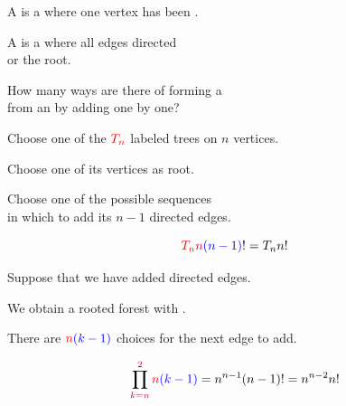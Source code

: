 \begin{frame}{}
  \begin{definition}
    A  is a 
    where one vertex has been .
  \end{definition}

  \pause

  \pause
  \begin{definition}
    A  is a 
    where all edges directed \\  or  the root.
  \end{definition}
\end{frame}

\begin{frame}{}
  \begin{center}
    {How many ways are there of forming a  \\[3pt]
    from an  by adding  one by one?}

    \pause
    \vspace{0.80cm}
    Choose one of the $\textcolor{red}{T_{n}}$ labeled trees on $n$ vertices.

    \pause
    \vspace{0.60cm}
    Choose one of its  vertices as root.

    \pause
    \vspace{0.60cm}
    Choose one of the  possible sequences \\
    in which to add its $n-1$ directed edges.
  \end{center}

  \[
    \textcolor{red}{T_n} \textcolor{purple}{n}\textcolor{blue}{(n-1)}! = T_n n!
  \]
\end{frame}

\begin{frame}{}
  \begin{center}
    Suppose that we have added  directed edges.

    \pause
    \vspace{0.30cm}
    We obtain a rooted forest with .

    \pause
    \vspace{0.30cm}
    There are $\textcolor{red}{n}\textcolor{blue}{(k-1)}$ choices for the next edge to add.
  \end{center}

  \pause

  \pause
  \[
    \prod_{\textcolor{purple}{k = n}}^{\textcolor{purple}{2}} \textcolor{red}{n}\textcolor{blue}{(k-1)}
      = n^{n-1} (n-1)! = n^{n-2} n!
  \]
\end{frame}

